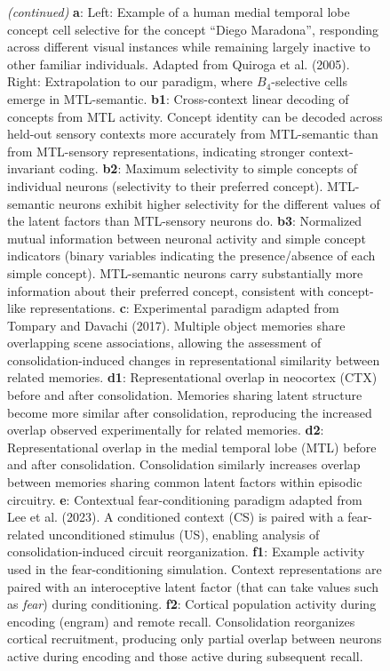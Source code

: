 \documentclass{article}
\begin{document}
\begin{figure}[h!]
  \ContinuedFloat
  \captionsetup{list=off,singlelinecheck=false} %
  \caption{\textit{(continued)} 
\textbf{a}: Left: Example of a human medial temporal lobe concept cell selective for the concept “Diego Maradona”, responding across different visual instances while remaining largely inactive to other familiar individuals. Adapted from Quiroga et al. (2005). Right: Extrapolation to our paradigm, where $B_4$-selective cells emerge in MTL-semantic.
\textbf{b1}: Cross-context linear decoding of concepts from MTL activity. Concept identity can be decoded across held-out sensory contexts more accurately from MTL-semantic than from MTL-sensory representations, indicating stronger context-invariant coding.
\textbf{b2}: Maximum selectivity to simple concepts of individual neurons (selectivity to their preferred concept). MTL-semantic neurons exhibit higher selectivity for the different values of the latent factors than MTL-sensory neurons do.
\textbf{b3}: Normalized mutual information between neuronal activity and simple concept indicators (binary variables indicating the presence/absence of each simple concept). MTL-semantic neurons carry substantially more information about their preferred concept, consistent with concept-like representations.
\textbf{c}: Experimental paradigm adapted from Tompary and Davachi (2017). Multiple object memories share overlapping scene associations, allowing the assessment of consolidation-induced changes in representational similarity between related memories.
\textbf{d1}: Representational overlap in neocortex (CTX) before and after consolidation. Memories sharing latent structure become more similar after consolidation, reproducing the increased overlap observed experimentally for related memories.
\textbf{d2}: Representational overlap in the medial temporal lobe (MTL) before and after consolidation. Consolidation similarly increases overlap between memories sharing common latent factors within episodic circuitry.
\textbf{e}: Contextual fear-conditioning paradigm adapted from Lee et al. (2023). A conditioned context (CS) is paired with a fear-related unconditioned stimulus (US), enabling analysis of consolidation-induced circuit reorganization.
\textbf{f1}: Example activity used in the fear-conditioning simulation. Context representations are paired with an interoceptive latent factor (that can take values such as \textit{fear}) during conditioning.
\textbf{f2}: Cortical population activity during encoding (engram) and remote recall. Consolidation reorganizes cortical recruitment, producing only partial overlap between neurons active during encoding and those active during subsequent recall.
}
\end{figure}
\end{document}
